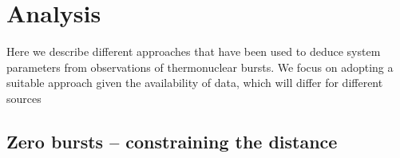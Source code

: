 \documentclass{aastex61}
\newcommand\aastex{AAS\TeX}
\begin{document}
%
%
%
%
%
%
%
%

\section{Analysis} 
\label{sec:analysis}

Here we describe different approaches that have been used to deduce system parameters from observations of thermonuclear bursts.
%
We focus on adopting a suitable approach given the availability of data, which will differ for different sources

\subsection{Zero bursts -- constraining the distance}
\label{subsec:zerobursts}
\end{document}
